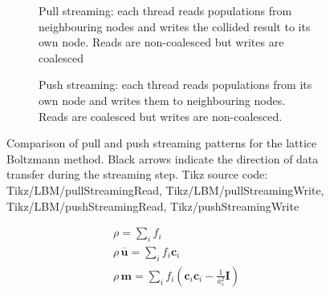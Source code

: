 \begin{figure}[hbt]
    \centering
    \begin{subfigure}[b]{0.48\textwidth}
        \centering
        \begin{minipage}{0.48\linewidth}
            \centering
            
        \end{minipage}
        \hfill
        \begin{minipage}{0.48\linewidth}
            \centering
            
        \end{minipage}
        \caption{Pull streaming: each thread reads populations from neighbouring nodes and writes the collided result to its own node. Reads are non-coalesced but writes are coalesced}
        \label{fig:pull_streaming}
    \end{subfigure}
    \hfill
    \begin{subfigure}[b]{0.48\textwidth}
        \centering
        \begin{minipage}{0.48\linewidth}
            \centering
            
        \end{minipage}
        \hfill
        \begin{minipage}{0.48\linewidth}
            \centering
            
        \end{minipage}
        \caption{Push streaming: each thread reads populations from its own node and writes them to neighbouring nodes. Reads are coalesced but writes are non-coalesced.}
        \label{fig:push_streaming}
    \end{subfigure}
    \caption{Comparison of pull and push streaming patterns for the lattice Boltzmann method. Black arrows indicate the direction of data transfer during the streaming step. Tikz source code: Tikz/LBM/pullStreamingRead, Tikz/LBM/pullStreamingWrite, Tikz/LBM/pushStreamingRead, Tikz/pushStreamingWrite}
    \label{fig:StreamingStrategies}
\end{figure}
%
\begin{subequations}\label{eq:Moments}
\begin{gather}
    \rho = \sum_i f_i \\
    \rho\,\overline{\boldsymbol{u}} = \sum_i f_i \boldsymbol{c}_i \\
    \rho\,\boldsymbol{m} = \sum_i f_i \left( \boldsymbol{c}_i \boldsymbol{c}_i - \frac{1}{a_{s}^{2}} \boldsymbol{I} \right)
\end{gather}
\end{subequations}
